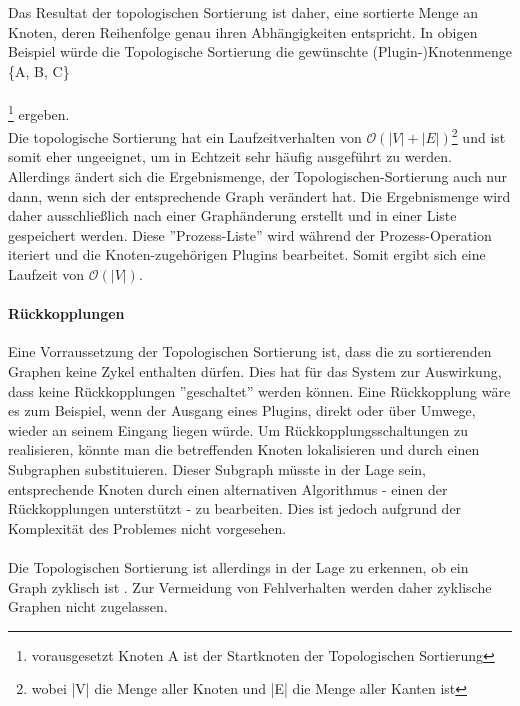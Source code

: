 Das Resultat der topologischen Sortierung ist daher, eine sortierte Menge an Knoten, deren Reihenfolge genau ihren Abhängigkeiten entspricht.
In obigen Beispiel würde die Topologische Sortierung die gewünschte (Plugin-)Knotenmenge \{A, B, C\}
\\\\
\footnote{vorausgesetzt Knoten A ist der Startknoten der Topologischen Sortierung} ergeben. \\
Die topologische Sortierung hat ein Laufzeitverhalten von $\mathcal O(|V| + |E|)$\footnote{wobei |V| die Menge aller Knoten und |E| die Menge aller Kanten ist} und ist somit eher ungeeignet, um in Echtzeit sehr häufig ausgeführt zu werden. Allerdings ändert sich die Ergebnismenge, der Topologischen-Sortierung auch nur dann, wenn sich der entsprechende Graph verändert hat.
Die Ergebnismenge wird daher ausschließlich nach einer Graphänderung erstellt und in einer Liste gespeichert werden. Diese ''Prozess-Liste'' wird während der Prozess-Operation iteriert und die Knoten-zugehörigen Plugins bearbeitet. Somit ergibt sich eine Laufzeit von $\mathcal O(|V|)$.
\paragraph{Rückkopplungen}
Eine Vorraussetzung der Topologischen Sortierung ist, dass die zu sortierenden Graphen keine Zykel enthalten dürfen. Dies hat für das System zur Auswirkung, dass keine Rückkopplungen ''geschaltet'' werden können. Eine Rückkopplung wäre es zum Beispiel, wenn der Ausgang eines Plugins, direkt oder über Umwege, wieder an seinem Eingang liegen würde. Um Rückkopplungsschaltungen zu realisieren, könnte man die betreffenden Knoten lokalisieren und durch einen Subgraphen substituieren. Dieser Subgraph müsste in der Lage sein, entsprechende Knoten durch einen alternativen Algorithmus - einen der Rückkopplungen unterstützt - zu bearbeiten. Dies ist jedoch aufgrund der Komplexität des Problemes nicht vorgesehen. 
\\\\
Die Topologischen Sortierung ist allerdings in der Lage zu erkennen, ob ein Graph zyklisch ist \footnotemark[13]. Zur Vermeidung von Fehlverhalten werden daher zyklische Graphen nicht zugelassen.  \\
